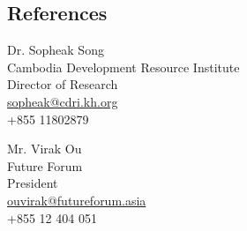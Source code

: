 \documentclass[10pt,a4paper]{article}
\begin{document}
\subsection*{References}		

\parbox{0.5\textwidth}{ %
	Dr. Sopheak Song\\ 
	Cambodia Development Resource Institute\\ 
	Director of Research\\
	\href{mailto: sopheak@cdri.kh.org}{sopheak@cdri.kh.org}\\
	+855 11802879
}
\hfill %
\parbox{0.5\textwidth}{ %
	Mr. Virak Ou\\ 
	Future Forum\\ 
	President\\
	\href{mailto: ouvirak@futureforum.asia}{ouvirak@futureforum.asia}\\
	+855 12 404 051
}

\end{document}
